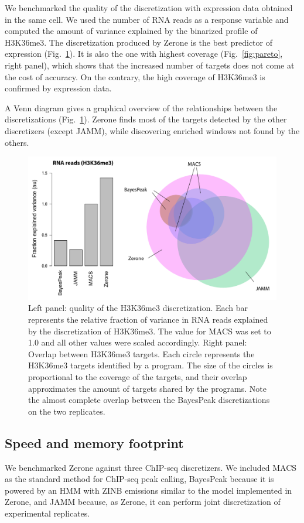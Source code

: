 \documentclass{bioinfo}
\begin{document}
We benchmarked the quality of the discretization with expression
data obtained in the same cell. We used the number of RNA reads
as a response variable and computed the amount of variance
explained by the binarized profile of H3K36me3. The discretization
produced by Zerone is the best predictor of expression
(Fig.~\ref{fig:venn}). It is also the one with highest coverage
(Fig.~\ref{fig:pareto}, right panel), which shows that the increased number of
targets does not come at the cost of accuracy. On the contrary,
the high coverage of H3K36me3 is confirmed by expression data.

A Venn diagram gives a graphical overview of the relationships
between the discretizations (Fig.~\ref{fig:venn}). Zerone finds
most of the targets detected by the other discretizers (except JAMM),
while discovering enriched windows not found by the others.

\begin{figure}[!tpb]
\centerline{\includegraphics[scale=0.4]{histone_venn_color_names.pdf}}
\caption{
  Left panel: quality of the H3K36me3 discretization. Each bar
  represents the relative fraction of variance in RNA reads
  explained by the discretization of H3K36me3. The value for MACS was
  set to 1.0 and all other values were scaled accordingly. Right
  panel: Overlap between H3K36me3 targets. Each circle represents the
  H3K36me3 targets identified by a program. The size of the circles
  is proportional to the coverage of the targets, and their overlap
  approximates the amount of targets shared by the programs. Note
  the almost complete overlap between the BayesPeak discretizations
  on the two replicates.
}\label{fig:venn}
\end{figure}

\subsection{Speed and memory footprint}
We benchmarked Zerone against three ChIP-seq discretizers.
We included MACS as the standard method for ChIP-seq peak calling,
BayesPeak because it is powered by an HMM with ZINB emissions
similar to the model implemented in Zerone, and JAMM because, as
Zerone, it can perform joint discretization of experimental replicates.
\end{document}
